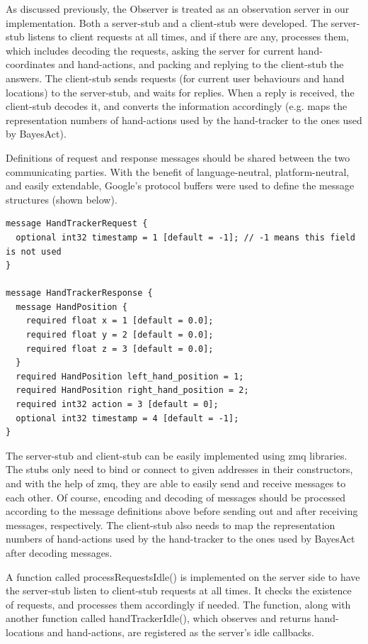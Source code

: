 As discussed previously, the Observer is treated as an observation server in our implementation. Both a server-stub and a client-stub were developed. The server-stub listens to client requests at all times, and if there are any, processes them, which includes decoding the requests, asking the server for current hand-coordinates and hand-actions, and packing and replying to the client-stub the answers. The client-stub sends requests (for current user behaviours and hand locations) to the server-stub, and waits for replies. When a reply is received, the client-stub decodes it, and converts the information accordingly (e.g. maps the representation numbers of hand-actions used by the hand-tracker to the ones used by BayesAct).

Definitions of request and response messages should be shared between the two communicating parties. With the benefit of language-neutral, platform-neutral, and easily extendable, Google's protocol buffers were used to define the message structures (shown below).

\begin{verbatim}
message HandTrackerRequest {
  optional int32 timestamp = 1 [default = -1]; // -1 means this field is not used
}

message HandTrackerResponse {
  message HandPosition {
    required float x = 1 [default = 0.0];
    required float y = 2 [default = 0.0];
    required float z = 3 [default = 0.0];
  }
  required HandPosition left_hand_position = 1;
  required HandPosition right_hand_position = 2;
  required int32 action = 3 [default = 0];
  optional int32 timestamp = 4 [default = -1];
}
\end{verbatim}

The server-stub and client-stub can be easily implemented using zmq libraries. The stubs only need to bind or connect to given addresses in their constructors, and with the help of zmq, they are able to easily send and receive messages to each other. Of course, encoding and decoding of messages should be processed according to the message definitions above before sending out and after receiving messages, respectively. The client-stub also needs to map the representation numbers of hand-actions used by the hand-tracker to the ones used by BayesAct after decoding messages.

A function called processRequestsIdle() is implemented on the server side to have the server-stub listen to client-stub requests at all times. It checks the existence of requests, and processes them accordingly if needed. The function, along with another function called handTrackerIdle(), which observes and returns hand-locations and hand-actions, are registered as the server's idle callbacks.


